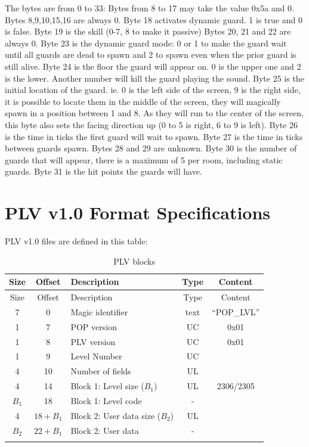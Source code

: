 \documentclass{article}
\begin{document}
 The bytes are from 0 to 33:
 Bytes from 8 to 17 may take the value 0x5a and 0. Bytes 8,9,10,15,16 are
  always 0.
 Byte 18 activates dynamic guard. 1 is true and 0 is false.
 Byte 19 is the skill (0-7, 8 to make it passive)
 Bytes 20, 21 and 22 are always 0.
 Byte 23 is the dynamic guard mode: 0 or 1 to make the guard wait until all
  guards are dead to spawn and 2 to spawn even when the prior guard is
  still alive.
 Byte 24 is the floor the guard will appear on. 0 is the upper one and 2 is
  the lower. Another number will kill the guard playing the sound.
 Byte 25 is the initial location of the guard. ie. 0 is the left side of
  the screen, 9 is the right side, it is possible to locate them in the
  middle of the screen, they will magically spawn in a position between 1
  and 8. As they will run to the center of the screen, this byte also sets
  the facing direction up (0 to 5 is right, 6 to 9 is left).
 Byte 26 is the time in ticks the first guard will wait to spawn.
 Byte 27 is the time in ticks between guards spawn.
 Bytes 28 and 29 are unknown.
 Byte 30 is the number of guards that will appear, there is a maximum of 5
  per room, including static guards.
 Byte 31 is the hit points the guards will have.

\pagebreak[3]
\section{PLV v1.0 Format Specifications}

 PLV v1.0 files are defined in this table:

\begin{longtable}{cclcc}
\hline
   Size&Offset&Description                 & Type  & Content \\
\hline
\endfirsthead
\hline
   Size&Offset&Description                 & Type  & Content \\
\hline
\endhead
\hline
      7     & 0& Magic identifier            & text  & ``POP\_LVL'' \\
      1     & 7& POP version                 & UC    & 0x01 \\
      1     & 8& PLV version                 & UC    & 0x01 \\
      1     & 9& Level Number                & UC \\
      4    & 10& Number of fields            & UL \\
      4    & 14& Block 1: Level size ($B_1$)    & UL    & 2306/2305 \\
     $B_1$    & 18& Block 1: Level code         & - \\
      4 & $18+B_1$& Block 2: User data size ($B_2$)& UL \\
     $B_2$ & $22+B_1$& Block 2: User data          & - \\
\hline
\caption{PLV blocks}
\label{palettes table}
\end{longtable}
\end{document}
